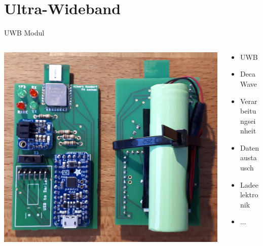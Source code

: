 \documentclass{beamer}
\begin{document}
%
% 
%
\part{Ultra-Wideband}


%
%
\begin{frame}{UWB Modul}
	\begin{columns}
		\begin{column}{0.5\linewidth}
			\includegraphics[width=\linewidth]{uwb_modul}
		\end{column}
		\begin{column}{0.5\linewidth}
			\begin{itemize}
				\item UWB
				\item DecaWave
				\item Verarbeitungseinheit
				\item Datenaustausch
				\item Ladeelektronik
				\item ...
			\end{itemize}
		\end{column}
	\end{columns}
\end{frame}
\end{document}
